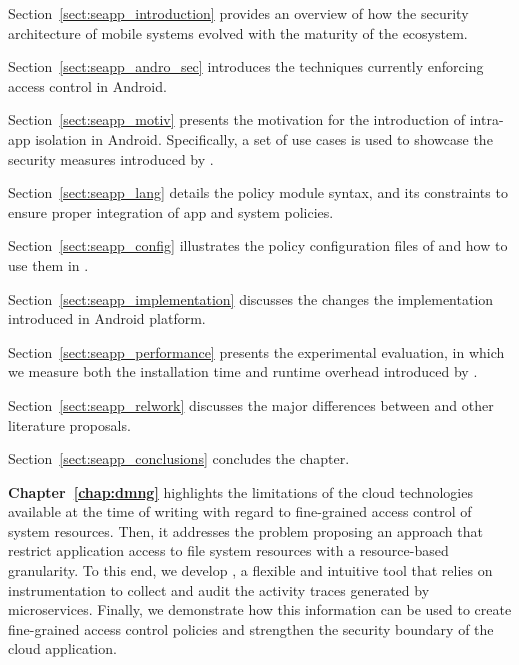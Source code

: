 \begin{compactitem}
    \item Section~\ref{sect:seapp_introduction} provides an overview
     of how the security architecture of mobile systems evolved with
     the maturity of the ecosystem.
    \item Section~\ref{sect:seapp_andro_sec} introduces the techniques
     currently enforcing access control in Android.
    \item Section~\ref{sect:seapp_motiv} presents the motivation for
     the introduction of intra-app isolation in Android. Specifically,
     a set of use cases is used to showcase the security measures
     introduced by \seapp.
    \item Section~\ref{sect:seapp_lang} details the \seapp policy
     module syntax, and its constraints to ensure proper integration
     of app and system policies.
    \item Section~\ref{sect:seapp_config} illustrates the policy
     configuration files of \sea and how to use them in \seapp.
    \item Section~\ref{sect:seapp_implementation} discusses the
     changes the \seapp implementation introduced in Android platform.
    \item Section~\ref{sect:seapp_performance} presents the
     experimental evaluation, in which we measure both the
     installation time and runtime overhead introduced by \seapp.
    \item Section~\ref{sect:seapp_relwork} discusses the major
     differences between \seapp and other literature proposals.
    \item Section~\ref{sect:seapp_conclusions} concludes the chapter.
\end{compactitem}
\medskip

\textbf{Chapter~\ref{chap:dmng}} highlights the limitations of
the cloud technologies available at the time of writing with regard to
fine-grained access control of system resources. Then, it addresses
the problem proposing an approach that restrict application access to
file system resources with a resource-based granularity. To this end,
we develop \dmng, a flexible and intuitive tool that relies on
instrumentation to collect and audit the activity traces generated by
microservices. Finally, we demonstrate how this information can be
used to create fine-grained access control policies and strengthen the
security boundary of the cloud application.

